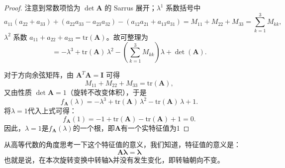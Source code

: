 \begin{proof}
    注意到常数项恰为 $\det\boldsymbol{A}$ 的 Sarrus 展开；$\lambda^{1}$ 系数括号中
    \[
    a_{11}(a_{22}+a_{33})+(a_{22}a_{33}-a_{23}a_{32})-(a_{12}a_{21}+a_{13}a_{31})
    =M_{11}+M_{22}+M_{33}=\sum_{k=1}^{3}M_{kk},
    \]
    $\lambda^{2}$ 系数 $a_{11}+a_{22}+a_{33}=\mathrm{tr}(\boldsymbol{A})$。故可整理为
    \[
    = -\lambda^{3} + \mathrm{tr}(\boldsymbol{A})\,\lambda^{2} - \left(\sum_{k=1}^{3}M_{kk}\right)\lambda + \det(\boldsymbol{A}).
    \]

    对于方向余弦矩阵，由 $\boldsymbol{A}^{T}\boldsymbol{A}=\boldsymbol{I}$ 可得
    \[
    M_{11}+M_{22}+M_{33} = \mathrm{tr}(\boldsymbol{A}),
    \]
    又由性质 $\det\boldsymbol{A}=1$（旋转不改变体积），于是
    \[
    f_{\boldsymbol{A}}(\lambda) = -\lambda^{3} + \mathrm{tr}(\boldsymbol{A})\,\lambda^{2} - \mathrm{tr}(\boldsymbol{A})\,\lambda + 1.
    \]
    将$\lambda=1$代入上式可得：
\[
f_{\boldsymbol{A}}(1) = -1 + \mathrm{tr}(\boldsymbol{A}) - \mathrm{tr}(\boldsymbol{A}) + 1 = 0.
\]
    因此，$\lambda=1$是$f_{\boldsymbol{A}}(\lambda)$的一个根，即$\boldsymbol{A}$有一个实特征值为1
\end{proof}

从高等代数的角度思考一下这个特征值的意义，我们知道，特征值的意义是：
\begin{equation}
    \boldsymbol{A}\mathbf{\lambda}=\mathbf{\lambda}
\end{equation}
也就是说，在本次旋转变换中转轴$\mathbf{\lambda}$并没有发生变化，即转轴朝向不变。

